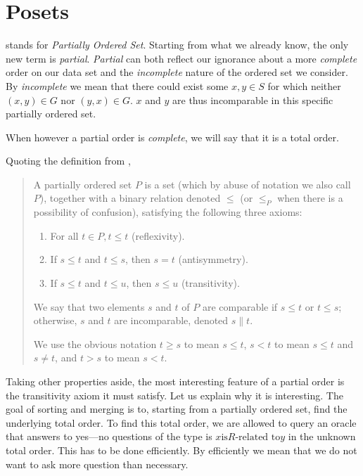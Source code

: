 \section{Posets}

 stands for \emph{Partially Ordered Set}. Starting from what we already know, the only new term is \emph{partial}. \emph{Partial} can both reflect our ignorance about a more \emph{complete} order on our data set and the \emph{incomplete} nature of the ordered set we consider. By \emph{incomplete} we mean that there could exist some $x, y \in S$ for which neither $(x, y) \in G$ nor $(y, x) \in G$. $x$ and $y$ are thus incomparable in this specific partially ordered set.


When however a partial order is \emph{complete}, we will say that it is a total order.

Quoting the definition from \cite{Stanley:2011:ECV:2124415},

\begin{quotation}

A partially ordered set $P$ is a set (which by abuse of notation we also call $P$), together with a binary relation denoted $\leq$ (or $\leq_P$ when there is a possibility of confusion), satisfying the following three axioms:

\begin{enumerate}
\item For all $t \in P, t \leq t$ (reflexivity).
\item If $s \leq t$ and $t \leq s$, then $s = t$ (antisymmetry).
\item If $s \leq t$ and $t \leq u$, then $s \leq u$ (transitivity).
\end{enumerate}

We say that two elements $s$ and $t$ of $P$ are comparable if $s \leq t$ or $t \leq s$; otherwise, $s$ and $t$ are incomparable, denoted $s \parallel t$.

We use the obvious notation $t \geq s$ to mean $s \leq t$, $s < t$ to mean $s \leq t$ and $s \neq t$, and $t > s$ to mean $s < t$.

\end{quotation}

Taking other properties aside, the most interesting feature of a partial order is the transitivity axiom it must satisfy. Let us explain why it is interesting. The goal of sorting and merging is to, starting from a partially ordered set, find the underlying total order. To find this total order, we are allowed to query an oracle that answers to yes---no questions of the type is $x \text{is} R\text{-related to} y$ in the unknown total order. This has to be done efficiently. By efficiently we mean that we do not want to ask more question than necessary.

